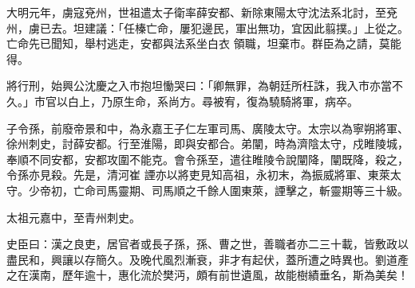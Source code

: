 \begin{pinyinscope}
 大明元年，虜寇兗州，世祖遣太子衛率薛安都、新除東陽太守沈法系北討，至兗州，虜已去。坦建議：「任榛亡命，屢犯邊民，軍出無功，宜因此翦撲。」上從之。亡命先已聞知，舉村逃走，安都與法系坐白衣
 領職，坦棄市。群臣為之請，莫能得。



 將行刑，始興公沈慶之入市抱坦慟哭曰：「卿無罪，為朝廷所枉誅，我入市亦當不久。」市官以白上，乃原生命，系尚方。尋被宥，復為驍騎將軍，病卒。



 子令孫，前廢帝景和中，為永嘉王子仁左軍司馬、廣陵太守。太宗以為寧朔將軍、徐州刺史，討薛安都。行至淮陽，即與安都合。弟闡，時為濟陰太守，戍睢陵城，奉順不同安都，安都攻圍不能克。會令孫至，遣往睢陵令說闡降，闡既降，殺之，令孫亦見殺。先是，清河崔
 諲亦以將吏見知高祖，永初末，為振威將軍、東萊太守。少帝初，亡命司馬靈期、司馬順之千餘人圍東萊，諲擊之，斬靈期等三十級。



 太祖元嘉中，至青州刺史。



 史臣曰：漢之良吏，居官者或長子孫，孫、曹之世，善職者亦二三十載，皆敷政以盡民和，興讓以存簡久。及晚代風烈漸衰，非才有起伏，蓋所遭之時異也。劉道產之在漢南，歷年逾十，惠化流於樊沔，頗有前世遺風，故能樹績垂名，斯為美矣！



\end{pinyinscope}